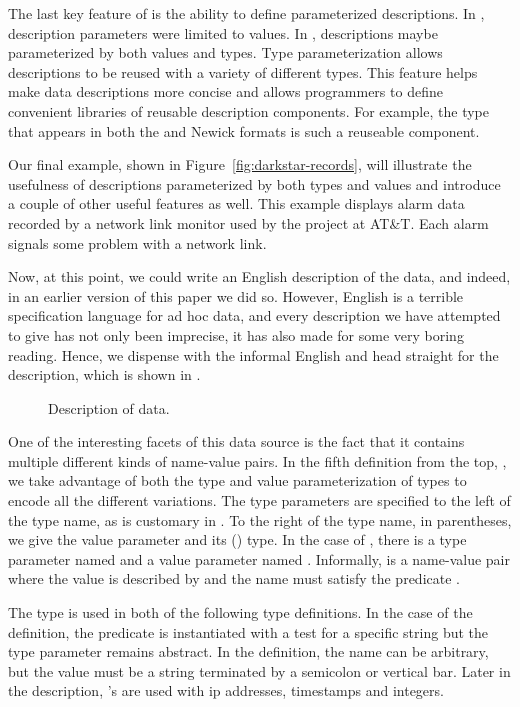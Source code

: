 The last key feature of \padsml{} is the ability to define
parameterized descriptions.  In \padsc, description parameters were
limited to values.  In \padsml, descriptions maybe parameterized by
both values and types.  Type parameterization allows descriptions to
be reused with a variety of different types.  This feature helps make
data descriptions more concise and allows programmers to define
convenient libraries of reusable description components. For example,
the  type that appears in both the \dibbler{} and Newick
formats is such a reuseable component.

Our final example, shown in Figure~\ref{fig:darkstar-records}, will
illustrate the usefulness of descriptions parameterized by both types
and values and introduce a couple of other useful features as well.
This example displays alarm data recorded by a network link monitor
used by the \darkstar{} project at AT\&T.  Each alarm signals some
problem with a network link.

Now, at this point, we could write an English description
of the \darkstar{} data, and indeed, in an earlier version of this paper
we did so.  However, English is a terrible specification language
for ad hoc data, and every description we have attempted to give has not 
only been imprecise, it has also made for some very 
boring reading.  Hence, we dispense with the informal
English and head straight for the \padsml{} description,
which is shown in .

\begin{figure}
  \centering
  
  \caption{Description of \darkstar{} data.}
  \label{fig:darkstar-ml}
\end{figure}

One of the interesting facets of this data source is the fact that it
contains multiple different kinds of name-value pairs.  In the fifth
definition from the top, , we take advantage of both the type
and value parameterization of types to encode all the different
variations. The type parameters are specified to the left of the type
name, as is customary in \ml{}.  To the right of the type name, in
parentheses, we give the value parameter and its (\ml{}) type.  In
the case of , there is a type parameter named  and
a value parameter named .  Informally,  is a
name-value pair where the value is described by  and the
name must satisfy the predicate .

The  type is used in both of the following type definitions.
In the case of the  definition, the predicate is instantiated
with a test for a specific string but the type parameter remains
abstract.  In the  definition, the name can be arbitrary,
but the value must be a string terminated by a semicolon or vertical
bar. Later in the description, 's are used with ip addresses,
timestamps and integers.

